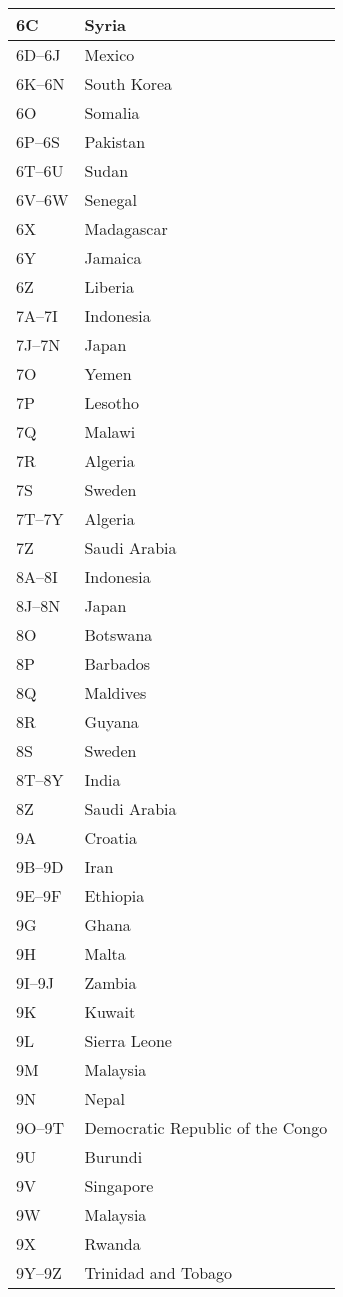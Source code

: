 \begin{longtable}{|l|l|}
	\hline
	6C & Syria \\
	\hline
	6D--6J & Mexico \\
	\hline
	6K--6N & South Korea \\
	\hline
	6O & Somalia \\
	\hline
	6P--6S & Pakistan \\
	\hline
	6T--6U & Sudan \\
	\hline
	6V--6W & Senegal \\
	\hline
	6X & Madagascar \\
	\hline
	6Y & Jamaica \\
	\hline
	6Z & Liberia \\
	\hline
	7A--7I & Indonesia \\
	\hline
	7J--7N & Japan \\
	\hline
	7O & Yemen \\
	\hline
	7P & Lesotho \\
	\hline
	7Q & Malawi \\
	\hline
	7R & Algeria \\
	\hline
	7S & Sweden \\
	\hline
	7T--7Y & Algeria \\
	\hline
	7Z & Saudi Arabia \\
	\hline
	8A--8I & Indonesia \\
	\hline
	8J--8N & Japan \\
	\hline
	8O & Botswana \\
	\hline
	8P & Barbados \\
	\hline
	8Q & Maldives \\
	\hline
	8R & Guyana \\
	\hline
	8S & Sweden \\
	\hline
	8T--8Y & India \\
	\hline
	8Z & Saudi Arabia \\
	\hline
	9A & Croatia \\
	\hline
	9B--9D & Iran \\
	\hline
	9E--9F & Ethiopia \\
	\hline
	9G & Ghana \\
	\hline
	9H & Malta \\
	\hline
	9I--9J & Zambia \\
	\hline
	9K & Kuwait \\
	\hline
	9L & Sierra Leone \\
	\hline
	9M & Malaysia \\
	\hline
	9N & Nepal \\
	\hline
	9O--9T & Democratic Republic of the Congo \\
	\hline
	9U & Burundi \\
	\hline
	9V & Singapore \\
	\hline
	9W & Malaysia \\
	\hline
	9X & Rwanda \\
	\hline
	9Y--9Z & Trinidad and Tobago \\
	\hline
\end{longtable}
	
